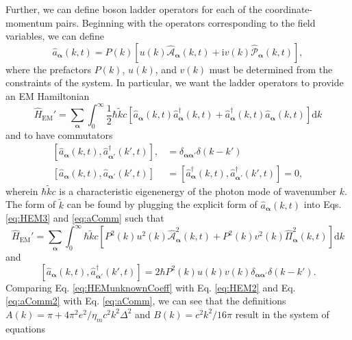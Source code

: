 \documentclass{article}
\begin{document}
Further, we can define boson ladder operators for each of the coordinate-momentum pairs. Beginning with the operators corresponding to the field variables, we can define
\begin{equation}
\hat{a}_{\bm{\alpha}}(k,t) = P(k)\left[u(k)\hat{\mathcal{A}}_{\bm{\alpha}}(k,t) + \mathrm{i}v(k)\hat{\mathcal{P}}_{\bm{\alpha}}(k,t)\right],
\end{equation}
where the prefactors $P(k)$, $u(k)$, and $v(k)$ must be determined from the constraints of the system. In particular, we want the ladder operators to provide an EM Hamiltonian
\begin{equation}\label{eq:HEM3}
\hat{H}_{\mathrm{EM}}' = \sum_{\bm{\alpha}}\int_0^\infty\frac{1}{2}\hbar\tilde{k}c\left[\hat{a}_{\bm{\alpha}}(k,t)\hat{a}_{\bm{\alpha}}^\dagger(k,t) + \hat{a}_{\bm{\alpha}}^\dagger(k,t)\hat{a}_{\bm{\alpha}}(k,t)\right]\mathrm{d}k
\end{equation}
and to have commutators
\begin{equation}\label{eq:aComm}
\begin{split}
[\hat{a}_{\bm{\alpha}}(k,t),\hat{a}_{\bm{\alpha}'}^\dagger(k',t)], &= \delta_{\bm{\alpha}\bm{\alpha}'}\delta(k - k')\\
[\hat{a}_{\bm{\alpha}}(k,t),\hat{a}_{\bm{\alpha}'}(k',t)] &= [\hat{a}_{\bm{\alpha}}^\dagger(k,t),\hat{a}_{\bm{\alpha}'}^\dagger(k',t)] = 0,
\end{split}
\end{equation}
wherein $\hbar\tilde{k}c$ is a characteristic eigenenergy of the photon mode of wavenumber $k$. The form of $\tilde{k}$ can be found by plugging the explicit form of $\hat{a}_{\bm{\alpha}}(k,t)$ into Eqs. \eqref{eq:HEM3} and \eqref{eq:aComm} such that
\begin{equation}\label{eq:HEMunknownCoeff}
\hat{H}_\mathrm{EM}' = \sum_{\bm{\alpha}}\int_0^\infty\hbar\tilde{k}c\left[P^2(k)u^2(k)\hat{\mathcal{A}}^2_{\bm{\alpha}}(k,t) + P^2(k)v^2(k)\hat{\mathit{\Pi}}_{\bm{\alpha}}^2(k,t)\right]\mathrm{d}k
\end{equation}
and
\begin{equation}\label{eq:aComm2}
[\hat{a}_{\bm{\alpha}}(k,t),\hat{a}_{\bm{\alpha}'}^\dagger(k',t)] = 2\hbar P^2(k)u(k)v(k)\delta_{\bm{\alpha}\bm{\alpha}'}\delta(k - k').
\end{equation}
Comparing Eq. \eqref{eq:HEMunknownCoeff} with Eq. \eqref{eq:HEM2} and Eq. \eqref{eq:aComm2} with Eq. \eqref{eq:aComm}, we can see that the definitions $A(k) = \pi + 4\pi^2e^2/\eta_mc^2k^2\Delta^2$ and $B(k) = c^2k^2/16\pi$ result in the system of equations
\end{document}
